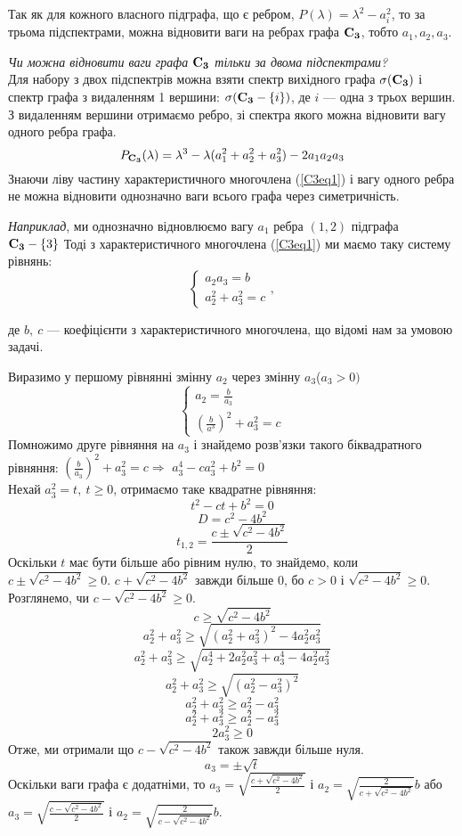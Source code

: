 Так як для кожного власного підграфа, що є ребром, $P(\lambda)=\lambda^2-a_i^2$, то за трьома підспектрами, можна відновити ваги на ребрах графа ${\bf C_3}$, тобто $a_1,a_2,a_3$.

\textit{Чи можна відновити ваги графа ${\bf C_3}$ тільки за двома підспектрами?}\\
Для набору з двох підспектрів можна взяти спектр вихідного графа $\sigma({\bf C_3})$ і спектр графа з видаленням 1 вершини:  $\sigma({\bf C_3}-\{i\})$, де $i$ --- одна з трьох вершин.
З видаленням вершини отримаємо ребро, зі спектра якого можна відновити вагу одного ребра графа.
\begin{equation}\label{C3eq1}
P_{\bf C_3}(\lambda)=\lambda^3 - \lambda(a_1^2+a_2^2+a_3^2)-2a_1a_2a_3\end{equation}
Знаючи ліву частину характеристичного многочлена (\ref{C3eq1}) і вагу одного ребра не можна відновити однозначно ваги всього графа через симетричність.

\textit{Наприклад}, ми однозначно відновлюємо вагу $a_1$ ребра $(1,2)$ підграфа\\ ${\bf C_3}-\{3\}$ 
Тоді з характеристичного многочлена (\ref{C3eq1}) ми маємо таку систему рівнянь:
\begin{equation}\label{c3eq}
   \begin{cases}
    a_2a_3 = b\\
    a_2^2 +a_3^2= c
    \end{cases}, 
\end{equation}

де $b,\ c$ --- коефіцієнти з характеристичного многочлена, що відомі нам за умовою задачі. 

Виразимо у першому рівнянні змінну $a_2$ через змінну $a_3$($a_3 > 0)$
\[\begin{cases}
a_2 = \frac{b}{a_3}\\
(\frac{b}{a^3})^2 +a_3^2= c
\end{cases}\]
Помножимо друге рівняння на $a_3$ і знайдемо розв'язки такого біквадратного рівняння: $(\frac{b}{a_3})^2 +a_3^2= c \Rightarrow$ 
$ a_3^4 - c a_3^2 + b^2 = 0$\\
Нехай $a_3^2 = t,\ t\geq0$, отримаємо таке квадратне рівняння:
\[t^2-c t +b^2 =0\]
\[D = c^2-4b^2\]
\[t_{1,2} = \frac{c\pm\sqrt{c^2-4b^2}}{2}\]
Оскільки $t$ має бути більше або рівним нулю, то знайдемо, коли\\
$c\pm\sqrt{c^2-4b^2}\geq 0$. $c+\sqrt{c^2-4b^2}$ завжди більше 0, бо $c>0$ і $\sqrt{c^2-4b^2}\geq0$. Розглянемо, чи $c-\sqrt{c^2-4b^2}\geq 0$.
\[c\geq\sqrt{c^2-4b^2}\]
\[a_2^2 +a_3^2 \geq \sqrt{(a_2^2 +a_3^2)^2-4a_2^2a_3^2}\]
\[a_2^2 +a_3^2 \geq \sqrt{a_2^4+2a_2^2a_3^2 +a_3^4-4a_2^2a_3^2}\]
\[a_2^2 +a_3^2 \geq \sqrt{(a_2^2 - a_3^2)^2}\]
\[a_2^2 +a_3^2 \geq a_2^2 - a_3^2\]
\[a_2^2 +a_3^2 \geq a_2^2 - a_3^2\]
\[2a_3^2 \geq 0\]
Отже, ми отримали що $c-\sqrt{c^2-4b^2}$ також завжди більше нуля.
\[a_3 = \pm \sqrt{t}\]
Оскільки ваги графа є додатніми, то $a_3 =  \sqrt{\frac{c+\sqrt{c^2-4b^2}}{2}}$ і $a_2 = \sqrt{\frac{2}{c+\sqrt{c^2-4b^2}}}b$ або $a_3 =  \sqrt{\frac{c-\sqrt{c^2-4b^2}}{2}}$ і $a_2 = \sqrt{\frac{2}{c-\sqrt{c^2-4b^2}}}b$.

